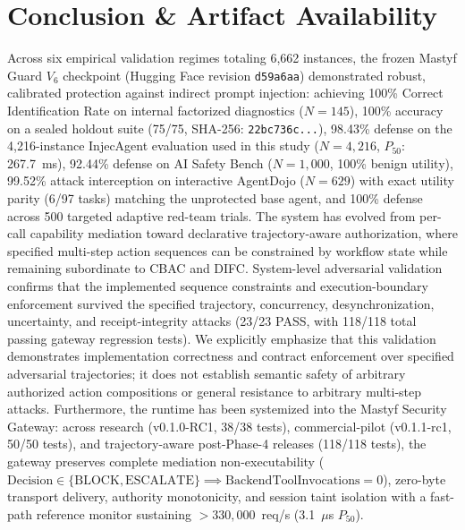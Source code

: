 \documentclass[10pt,journal,compsoc]{IEEEtran}
\begin{document}
\section{Conclusion \& Artifact Availability}
Across six empirical validation regimes totaling 6,662 instances, the frozen Mastyf Guard $V_6$ checkpoint (Hugging Face revision \texttt{d59a6aa}) demonstrated robust, calibrated protection against indirect prompt injection: achieving 100\% Correct Identification Rate on internal factorized diagnostics ($N = 145$), 100\% accuracy on a sealed holdout suite (75/75, SHA-256: \texttt{22bc736c...}), 98.43\% defense on the 4,216-instance InjecAgent evaluation used in this study ($N = 4,216$, $P_{50}$: 267.7~ms), 92.44\% defense on AI Safety Bench ($N = 1,000$, 100\% benign utility), 99.52\% attack interception on interactive AgentDojo ($N = 629$) with exact utility parity (6/97 tasks) matching the unprotected base agent, and 100\% defense across 500 targeted adaptive red-team trials. The system has evolved from per-call capability mediation toward declarative trajectory-aware authorization, where specified multi-step action sequences can be constrained by workflow state while remaining subordinate to CBAC and DIFC. System-level adversarial validation confirms that the implemented sequence constraints and execution-boundary enforcement survived the specified trajectory, concurrency, desynchronization, uncertainty, and receipt-integrity attacks (23/23 PASS, with 118/118 total passing gateway regression tests). We explicitly emphasize that this validation demonstrates implementation correctness and contract enforcement over specified adversarial trajectories; it does not establish semantic safety of arbitrary authorized action compositions or general resistance to arbitrary multi-step attacks. Furthermore, the runtime has been systemized into the Mastyf Security Gateway: across research (v0.1.0-RC1, 38/38 tests), commercial-pilot (v0.1.1-rc1, 50/50 tests), and trajectory-aware post-Phase-4 releases (118/118 tests), the gateway preserves complete mediation non-executability ($\text{Decision} \in \{\text{BLOCK}, \text{ESCALATE}\} \implies \text{BackendToolInvocations} = 0$), zero-byte transport delivery, authority monotonicity, and session taint isolation with a fast-path reference monitor sustaining $>330,000$~req/s (3.1~$\mu$s $P_{50}$).
\end{document}
